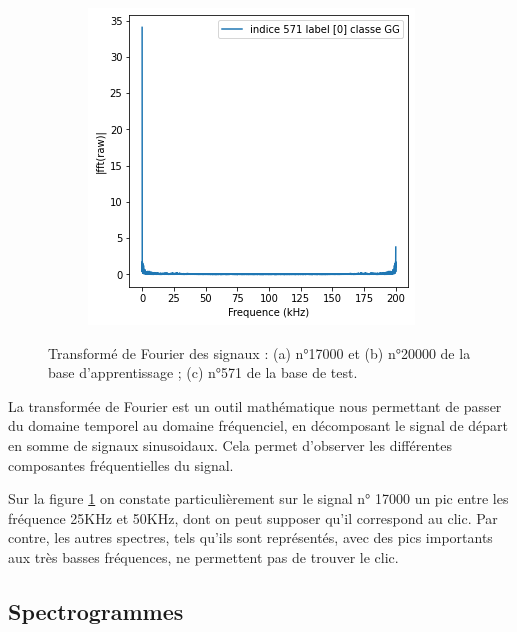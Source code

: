 \begin{figure}[!h]
\begin{subfigure}[b]{0.2\textwidth}
  \end{subfigure}
  \begin{subfigure}[b]{0.2\textwidth}
    \includegraphics[width=\textwidth]{./images/571fft.png}
  \end{subfigure}
  \caption{Transformé de Fourier des signaux : (a) n°17000 et (b) n°20000 de la base d'apprentissage ; (c) n°571 de la base de test.%
\label{fig:tf}}
\end{figure}

La transformée de Fourier est un outil mathématique nous permettant de passer du domaine temporel au domaine fréquenciel, en décomposant le signal de départ en somme de signaux sinusoidaux.
Cela permet d'observer les différentes composantes fréquentielles du signal.

Sur la figure \ref{fig:tf} on constate particulièrement sur le signal n° 17000 un pic entre les fréquence 25KHz et 50KHz, dont on peut supposer qu'il correspond au clic.
Par contre, les autres spectres, tels qu'ils sont représentés, avec des pics importants aux très basses fréquences, ne permettent pas de trouver le clic.

\hypertarget{Spectrogrammes}{%
\subsection{Spectrogrammes}
\label{Spectrogrammes}}

